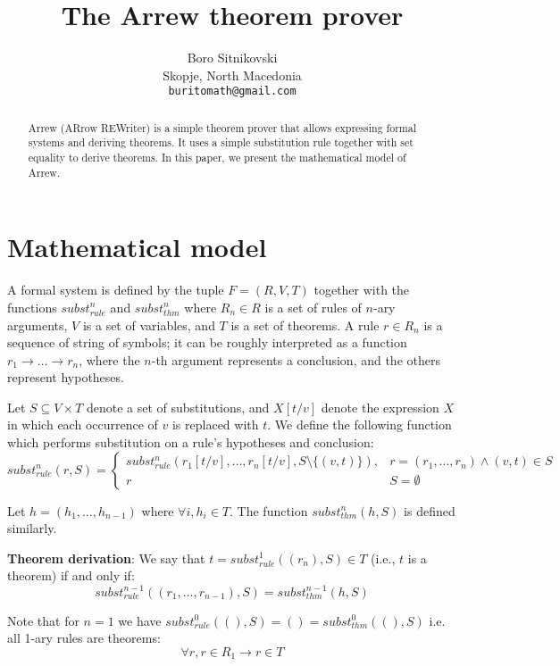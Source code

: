 \documentclass{article}
\title{The Arrew theorem prover}
\author{
  Boro Sitnikovski \\
  Skopje, North Macedonia \\
  \texttt{buritomath@gmail.com} \\
}
\begin{document}
\maketitle

\begin{abstract}
Arrew (ARrow REWriter) is a simple theorem prover that allows expressing formal systems and deriving theorems. It uses a simple substitution rule together with set equality to derive theorems. In this paper, we present the mathematical model of Arrew.
\end{abstract}


\section{Mathematical model}

A formal system is defined by the tuple $F = (R, V, T)$ together with the functions $subst_{rule}^n$ and $subst_{thm}^n$ where $R_n \in R$ is a set of rules of $n$-ary arguments, $V$ is a set of variables, and $T$ is a set of theorems. A rule $r \in R_n$ is a sequence of string of symbols; it can be roughly interpreted as a function $r_1 \to \ldots \to r_n$, where the $n$-th argument represents a conclusion, and the others represent hypotheses.

Let $S \subseteq V \times T$ denote a set of substitutions, and $X[t/v]$ denote the expression $X$ in which each occurrence of $v$ is replaced with $t$. We define the following function which performs substitution on a rule's hypotheses and conclusion:
$$ subst_{rule}^n(r, S) = {
\begin{cases}
subst_{rule}^n(r_1[t/v], \ldots, r_n[t/v], S \setminus \{(v, t) \}), & r = (r_1, \ldots, r_n) \land (v, t) \in S \\
r & S = \emptyset
\end{cases}}
$$

Let $h = (h_1, \ldots, h_{n-1})$ where $\forall i, h_i \in T$. The function $subst_{thm}^n(h, S)$ is defined similarly.

\textbf{Theorem derivation}: We say that $t = subst_{rule}^1((r_n), S) \in T$ (i.e., $t$ is a theorem) if and only if:
$$subst_{rule}^{n-1}((r_1, \ldots, r_{n-1}), S) = subst_{thm}^{n-1}(h, S)$$

Note that for $n = 1$ we have $subst_{rule}^0((), S) = () = subst_{thm}^0((), S)$ i.e. all 1-ary rules are theorems:
$$\forall r, r \in R_1 \to r \in T$$
\end{document}
